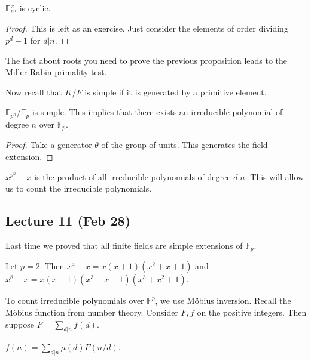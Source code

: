 \documentclass[10pt, twoside]{article}
\newcommand{\F}{\mathbb{F}}
\begin{document}
        \begin{prop} $\F_{p^n}^{\times}$ is cyclic.  \begin{proof} This is left
        as an exercise. Just consider the elements of order dividing $p^d-1$
    for $d | n$.  \end{proof} \end{prop}

        \begin{rmk} The fact about roots you need to prove the previous
        proposition leads to the Miller-Rabin primality test.  \end{rmk}

        Now recall that $K/F$ is simple if it is generated by a primitive
        element.

        \begin{cor} $\F_{p^n}/\F_p$ is simple. This implies that there exists
            an irreducible polynomial of degree $n$ over $\F_p$.  \begin{proof}
            Take a generator $\theta$ of the group of units. This generates the
        field extension.  \end{proof} \end{cor}

        \begin{rmk} $x^{p^n} - x$ is the product of all irreducible polynomials
        of degree $d | n$. This will allow us to count the irreducible
    polynomials.  \end{rmk}

        \subsection{Lecture 11 (Feb 28)}
        
        Last time we proved that all finite fields are simple extensions of
        $\F_p$. 

        \begin{exm} Let $p = 2$. Then $x^4-x = x(x+1)(x^2+x+1)$ and $x^8-x =
        x(x+1)(x^3+x+1)(x^3+x^2+1)$.  \end{exm}

        To count irreducible polynomials over $\F^p$, we use M\"obius
        inversion. Recall the M\"obius function from number theory. Consider
        $F,f$ on the positive integers. Then suppose $F = \sum_{d|n} f(d)$.

        \begin{thm} $f(n) = \sum_{d|n} \mu(d)F(n/d)$.
        \end{thm}
\end{document}
